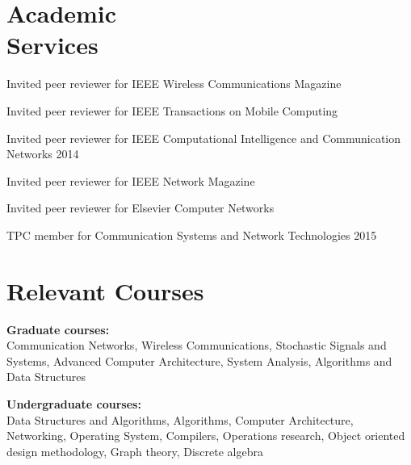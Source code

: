 \documentclass[margin,line]{resume}
\begin{document}
\begin{resume}
    \section{\mysidestyle Academic\\Services}
\begin{list2}
\item Invited peer reviewer for IEEE Wireless Communications Magazine
\item Invited peer reviewer for IEEE Transactions on Mobile Computing
\item Invited peer reviewer for IEEE Computational Intelligence and Communication Networks 2014
\item Invited peer reviewer for IEEE Network Magazine
\item Invited peer reviewer for Elsevier Computer Networks
\item TPC member for Communication Systems and Network Technologies 2015
\end{list2}


%
\section{\mysidestyle Relevant Courses} 
\begin{list2}
\item \textbf{Graduate courses:}\\
Communication Networks, Wireless Communications, Stochastic Signals and Systems, Advanced Computer Architecture, System Analysis, Algorithms and Data Structures\\

\item \textbf{Undergraduate courses:}\\
Data Structures and Algorithms, Algorithms, Computer Architecture, Networking, Operating System, Compilers, Operations research, Object oriented design methodology, Graph theory, Discrete algebra
\end{list2}


\end{resume}
\end{document}
